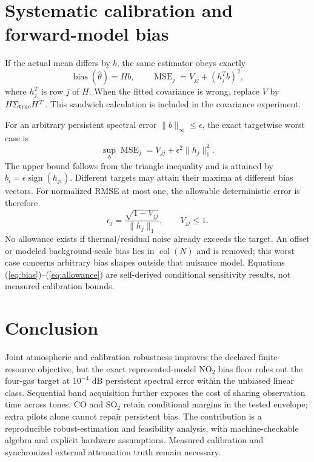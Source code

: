 \documentclass[conference]{IEEEtran}
\begin{document}
\section{Systematic calibration and forward-model bias}
If the actual mean differs by $b$, the same estimator obeys exactly
\begin{equation}
\operatorname{bias}(\widehat\theta)=Hb,\qquad
\operatorname{MSE}_j=V_{jj}+(h_j^Tb)^2,
\label{eq:bias}
\end{equation}
where $h_j^T$ is row $j$ of $H$. When the fitted covariance is wrong, replace $V$ by $H\Sigma_{\rm true}H^T$. This sandwich calculation is included in the covariance experiment.

For an arbitrary persistent spectral error $\|b\|_\infty\le\epsilon$, the exact targetwise worst case is
\begin{equation}
\sup_b\operatorname{MSE}_j=V_{jj}+\epsilon^2\|h_j\|_1^2.
\end{equation}
The upper bound follows from the triangle inequality and is attained by $b_i=\epsilon\operatorname{sign}(h_{ji})$. Different targets may attain their maxima at different bias vectors. For normalized RMSE at most one, the allowable deterministic error is therefore
\begin{equation}
\epsilon_j=\frac{\sqrt{1-V_{jj}}}{\|h_j\|_1},\qquad V_{jj}\le1.
\label{eq:allowance}
\end{equation}
No allowance exists if thermal/residual noise already exceeds the target. An offset or modeled background-scale bias lies in $\operatorname{col}(N)$ and is removed; this worst case concerns arbitrary bias shapes outside that nuisance model. Equations (\ref{eq:bias})--(\ref{eq:allowance}) are self-derived conditional sensitivity results, not measured calibration bounds.



\section{Conclusion}
Joint atmospheric and calibration robustness improves the declared finite-resource objective, but the exact represented-model NO$_2$ bias floor rules out the four-gas target at $10^{-4}$ dB persistent spectral error within the unbiased linear class. Sequential band acquisition further exposes the cost of sharing observation time across tones. CO and SO$_2$ retain conditional margins in the tested envelope; extra pilots alone cannot repair persistent bias. The contribution is a reproducible robust-estimation and feasibility analysis, with machine-checkable algebra and explicit hardware assumptions. Measured calibration and synchronized external attenuation truth remain necessary.
\end{document}
